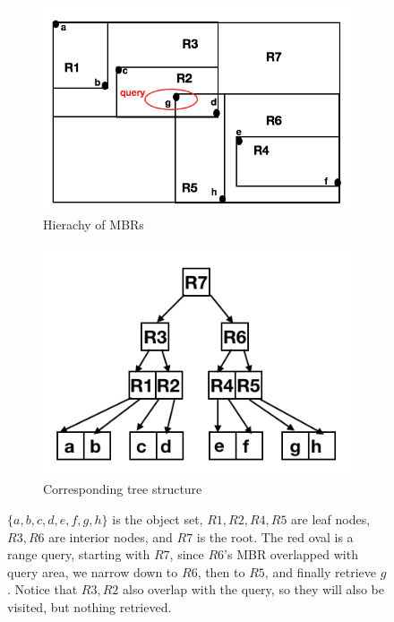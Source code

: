 \begin{figure}[htp]
  \centering
  \begin{subfigure}{.5\textwidth}
    \includegraphics[width=\linewidth]{./pic/hierarchy_mbr.png}
    \caption{Hierachy of MBRs}
    \label{hmbr}
  \end{subfigure}%
  \begin{subfigure}{.5\textwidth}
    \includegraphics[width=\linewidth]{./pic/rtree.png}
    \caption{Corresponding tree structure}
    \label{tree}
  \end{subfigure}
  \caption{\small $\{a,b,c,d,e,f,g,h\}$ is the object set,
  $R1,R2,R4,R5$ are leaf nodes, $R3,R6$ are interior nodes, and $R7$ is the root.
  The red oval is a range query, starting with $R7$, since $R6$'s MBR overlapped with query
  area, we narrow down to $R6$, then to $R5$, and finally retrieve $g$. Notice that $R3,R2$ also
  overlap with the query, so they will also be visited, but nothing retrieved.
  }
  \label{rtree}
\end{figure}

